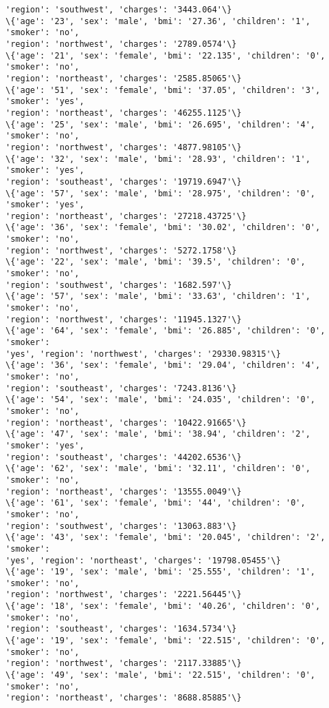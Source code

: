 \documentclass[11pt]{article}
\begin{document}
\begin{Verbatim}[commandchars=\\\{\}]
'region': 'southwest', 'charges': '3443.064'\}
\{'age': '23', 'sex': 'male', 'bmi': '27.36', 'children': '1', 'smoker': 'no',
'region': 'northwest', 'charges': '2789.0574'\}
\{'age': '21', 'sex': 'female', 'bmi': '22.135', 'children': '0', 'smoker': 'no',
'region': 'northeast', 'charges': '2585.85065'\}
\{'age': '51', 'sex': 'female', 'bmi': '37.05', 'children': '3', 'smoker': 'yes',
'region': 'northeast', 'charges': '46255.1125'\}
\{'age': '25', 'sex': 'male', 'bmi': '26.695', 'children': '4', 'smoker': 'no',
'region': 'northwest', 'charges': '4877.98105'\}
\{'age': '32', 'sex': 'male', 'bmi': '28.93', 'children': '1', 'smoker': 'yes',
'region': 'southeast', 'charges': '19719.6947'\}
\{'age': '57', 'sex': 'male', 'bmi': '28.975', 'children': '0', 'smoker': 'yes',
'region': 'northeast', 'charges': '27218.43725'\}
\{'age': '36', 'sex': 'female', 'bmi': '30.02', 'children': '0', 'smoker': 'no',
'region': 'northwest', 'charges': '5272.1758'\}
\{'age': '22', 'sex': 'male', 'bmi': '39.5', 'children': '0', 'smoker': 'no',
'region': 'southwest', 'charges': '1682.597'\}
\{'age': '57', 'sex': 'male', 'bmi': '33.63', 'children': '1', 'smoker': 'no',
'region': 'northwest', 'charges': '11945.1327'\}
\{'age': '64', 'sex': 'female', 'bmi': '26.885', 'children': '0', 'smoker':
'yes', 'region': 'northwest', 'charges': '29330.98315'\}
\{'age': '36', 'sex': 'female', 'bmi': '29.04', 'children': '4', 'smoker': 'no',
'region': 'southeast', 'charges': '7243.8136'\}
\{'age': '54', 'sex': 'male', 'bmi': '24.035', 'children': '0', 'smoker': 'no',
'region': 'northeast', 'charges': '10422.91665'\}
\{'age': '47', 'sex': 'male', 'bmi': '38.94', 'children': '2', 'smoker': 'yes',
'region': 'southeast', 'charges': '44202.6536'\}
\{'age': '62', 'sex': 'male', 'bmi': '32.11', 'children': '0', 'smoker': 'no',
'region': 'northeast', 'charges': '13555.0049'\}
\{'age': '61', 'sex': 'female', 'bmi': '44', 'children': '0', 'smoker': 'no',
'region': 'southwest', 'charges': '13063.883'\}
\{'age': '43', 'sex': 'female', 'bmi': '20.045', 'children': '2', 'smoker':
'yes', 'region': 'northeast', 'charges': '19798.05455'\}
\{'age': '19', 'sex': 'male', 'bmi': '25.555', 'children': '1', 'smoker': 'no',
'region': 'northwest', 'charges': '2221.56445'\}
\{'age': '18', 'sex': 'female', 'bmi': '40.26', 'children': '0', 'smoker': 'no',
'region': 'southeast', 'charges': '1634.5734'\}
\{'age': '19', 'sex': 'female', 'bmi': '22.515', 'children': '0', 'smoker': 'no',
'region': 'northwest', 'charges': '2117.33885'\}
\{'age': '49', 'sex': 'male', 'bmi': '22.515', 'children': '0', 'smoker': 'no',
'region': 'northeast', 'charges': '8688.85885'\}

\end{Verbatim}
\end{document}
